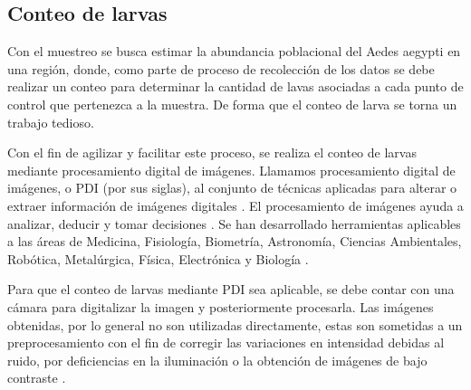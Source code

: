 \subsection{Conteo de larvas}
Con el muestreo se busca estimar la abundancia poblacional del Aedes aegypti en una región, donde,
como parte de proceso de recolección de los datos se debe realizar un conteo para determinar la
cantidad de lavas asociadas a cada punto de control que pertenezca a la muestra. De forma que el
conteo de larva se torna un trabajo tedioso.

Con el fin de agilizar y facilitar este proceso, se realiza el conteo de larvas mediante
procesamiento digital de imágenes. Llamamos procesamiento digital de imágenes, o PDI (por sus
siglas), al conjunto de técnicas aplicadas para alterar o extraer información de imágenes digitales
\cite{moreira2009implementacion, ortiz2013procesamiento}. El procesamiento de imágenes ayuda a
analizar, deducir y tomar decisiones \cite{ortiz2013procesamiento}. Se han desarrollado
herramientas aplicables a las áreas de Medicina, Fisiología, Biometría, Astronomía, Ciencias
Ambientales, Robótica, Metalúrgica, Física, Electrónica y Biología \cite{ortiz2013procesamiento, santillan2008deteccion, moreira2009implementacion}.

Para que el conteo de larvas mediante PDI sea aplicable, se debe contar con una cámara para
digitalizar la imagen y posteriormente procesarla. Las imágenes obtenidas, por lo general no son
utilizadas directamente, estas son sometidas a un preprocesamiento con el fin de corregir las
variaciones en intensidad debidas al ruido, por deficiencias en la iluminación o la obtención de
imágenes de bajo contraste \citep{santillan2008deteccion}.

